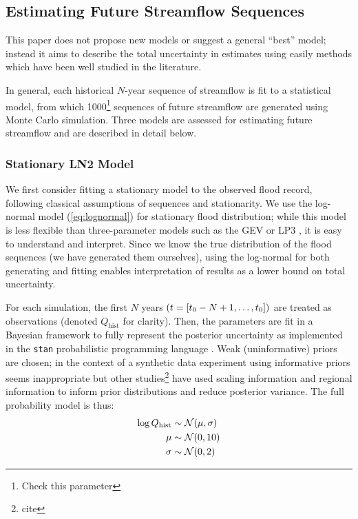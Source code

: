 \documentclass[12pt]{article}
\begin{document}
\subsection{Estimating Future Streamflow Sequences\label{sec:estimation}}

This paper does not propose new models or suggest a general ``best'' model; instead it aims to describe the total uncertainty in estimates using easily methods which have been well studied in the literature.

In general, each historical \(N\)-year sequence of streamflow is fit to a statistical model, from which 1000\footnote{Check this parameter} sequences of future streamflow are generated using Monte Carlo simulation.
Three models are assessed for estimating future streamflow and are described in detail below.

\subsubsection{Stationary LN2 Model\label{sec:method-stationary}}

We first consider fitting a stationary model to the observed flood record, following classical assumptions of \iid sequences and stationarity.
We use the log-normal model (\cref{eq:lognormal}) for stationary flood distribution; while this model is less flexible than three-parameter models such as the GEV or LP3 \citep{Vogel1996}, it is easy to understand and interpret.
Since we know the true distribution of the flood sequences (we have generated them ourselves), using the log-normal for both generating and fitting enables interpretation of results as a lower bound on total uncertainty.

For each simulation, the first \(N\) years \(\qty(t=[t_0-N+1, \ldots, t_0])\) are treated as observations (denoted \(Q_{\text{hist}}\) for clarity).
Then, the parameters are fit in a Bayesian framework to fully represent the posterior uncertainty as implemented in the \texttt{stan} probabilistic programming language \citep{Carpenter2016}.
Weak (uninformative) priors are chosen; in the context of a synthetic data experiment using informative priors seems inappropriate but other studies\footnote{cite} have used scaling information and regional information to inform prior distributions and reduce posterior variance.
The full probability model is thus:
\begin{align}
  \log Q_\text{hist} & \sim \mathcal{N} \qty(\mu, \sigma) \\
  \mu &\sim \mathcal{N} \qty(0, 10) \\
  \sigma &\sim \mathcal{N} \qty(0, 2)
\end{align}
\end{document}
